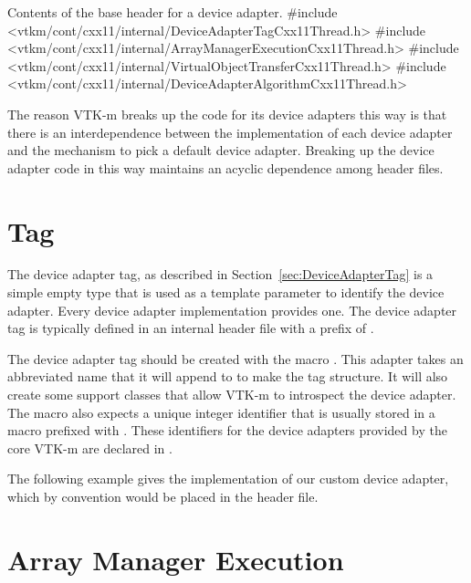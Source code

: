 \begin{vtkmexample}{Contents of the base header for a device adapter.}
#include <vtkm/cont/cxx11/internal/DeviceAdapterTagCxx11Thread.h>
#include <vtkm/cont/cxx11/internal/ArrayManagerExecutionCxx11Thread.h>
#include <vtkm/cont/cxx11/internal/VirtualObjectTransferCxx11Thread.h>
#include <vtkm/cont/cxx11/internal/DeviceAdapterAlgorithmCxx11Thread.h>
\end{vtkmexample}

The reason VTK-m breaks up the code for its device adapters this way is
that there is an interdependence between the implementation of each device
adapter and the mechanism to pick a default device adapter. Breaking up the
device adapter code in this way maintains an acyclic dependence among
header files.

\section{Tag}


The device adapter tag, as described in Section~\ref{sec:DeviceAdapterTag}
is a simple empty type that is used as a template parameter to identify the
device adapter. Every device adapter implementation provides one. The
device adapter tag is typically defined in an internal header file with a
prefix of .

The device adapter tag should be created with the macro
. This adapter takes an abbreviated
name that it will append to  to make the tag
structure. It will also create some support classes that allow VTK-m to
introspect the device adapter. The macro also expects a unique integer
identifier that is usually stored in a macro prefixed with
. These identifiers for the device
adapters provided by the core VTK-m are declared in
.

The following example gives the implementation of our custom device
adapter, which by convention would be placed in the
header file.



\section{Array Manager Execution}

